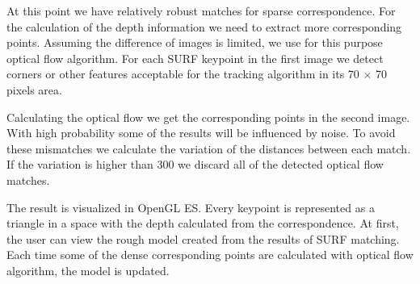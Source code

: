 

At this point we have relatively robust matches for sparse correspondence. 
For the calculation of the depth information we need to extract more corresponding points.
Assuming the difference of images is limited, we use for this purpose optical flow algorithm. 
For each SURF keypoint in the first image we detect corners or other features acceptable for the tracking algorithm in its 70 $\times$ 70 pixels area.


Calculating the optical flow we get the corresponding points in the second image.
With high probability some of the results will be influenced by noise.
To avoid these mismatches we calculate the variation of the distances between each match.
If the variation is higher than 300 we discard all of the detected optical flow matches.

The result is visualized in OpenGL ES.
Every keypoint is represented as a triangle in a space with the depth calculated from the correspondence.
At first, the user can view the rough model created from the results of SURF matching.
Each time some of the dense corresponding points are calculated with optical flow algorithm, the model is updated.


